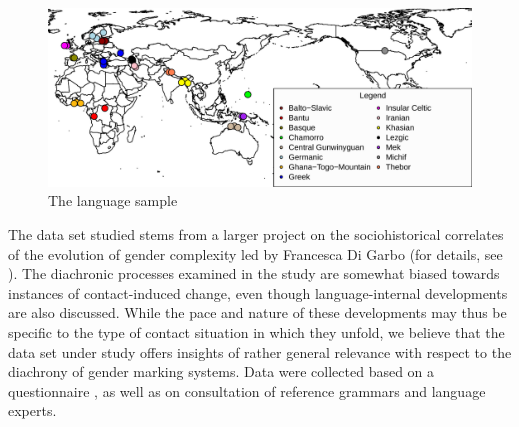 \documentclass[output=collectionpaper]{langsci/langscibook}
\begin{document}
\begin{figure}
\includegraphics[width=\textwidth]{figures/11/VolumeSample1a}
\caption{The language sample}
\label{fig:dgm:sample}
\end{figure}

The data set studied stems from a larger project on the sociohistorical correlates of the evolution of gender complexity led by Francesca Di Garbo (for details, see \citealt{DiGarboinpreparation}). The diachronic processes examined in the study are somewhat biased towards instances of contact-induced change, even though language-internal developments are also discussed. While the pace and nature of these developments may thus be specific to the type of contact situation in which they unfold, we believe that the data set under study offers insights of rather general relevance with respect to the diachrony of gender marking systems. Data were collected based on a questionnaire \citep{DiGarbo2015a}, as well as on consultation of reference grammars and language experts.
\end{document}
